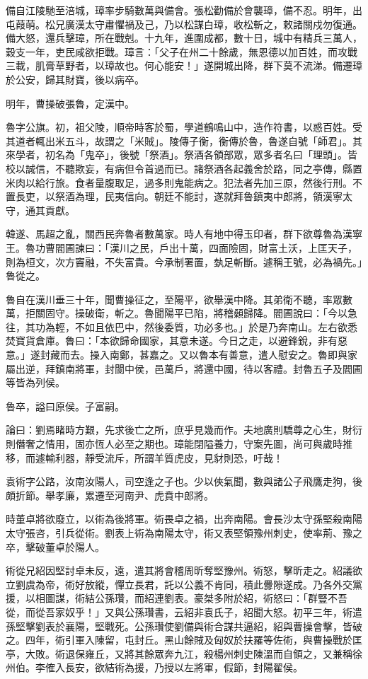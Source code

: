 \begin{pinyinscope}
備自江陵馳至涪城，璋率步騎數萬與備會。張松勸備於會襲璋，備不忍。明年，出屯葭萌。松兄廣漢太守肅懼禍及己，乃以松謀白璋，收松斬之，敕諸關戍勿復通。備大怒，還兵擊璋，所在戰剋。十九年，進圍成都，數十日，城中有精兵三萬人，穀支一年，吏民咸欲拒戰。璋言：「父子在州二十餘歲，無恩德以加百姓，而攻戰三載，肌膏草野者，以璋故也。何心能安！」遂開城出降，群下莫不流涕。備遷璋於公安，歸其財寶，後以病卒。

明年，曹操破張魯，定漢中。

魯字公旗。初，祖父陵，順帝時客於蜀，學道鶴鳴山中，造作符書，以惑百姓。受其道者輒出米五斗，故謂之「米賊」。陵傳子衡，衡傳於魯，魯遂自號「師君」。其來學者，初名為「鬼卒」，後號「祭酒」。祭酒各領部眾，眾多者名曰「理頭」。皆校以誠信，不聽欺妄，有病但令首過而已。諸祭酒各起義舍於路，同之亭傳，縣置米肉以給行旅。食者量腹取足，過多則鬼能病之。犯法者先加三原，然後行刑。不置長吏，以祭酒為理，民夷信向。朝廷不能討，遂就拜魯鎮夷中郎將，領漢寧太守，通其貢獻。

韓遂、馬超之亂，關西民奔魯者數萬家。時人有地中得玉印者，群下欲尊魯為漢寧王。魯功曹閻圃諫曰：「漢川之民，戶出十萬，四面險固，財富土沃，上匡天子，則為桓文，次方竇融，不失富貴。今承制署置，埶足斬斷。遽稱王號，必為禍先。」魯從之。

魯自在漢川垂三十年，聞曹操征之，至陽平，欲舉漢中降。其弟衛不聽，率眾數萬，拒關固守。操破衛，斬之。魯聞陽平已陷，將稽顙歸降。閻圃說曰：「今以急往，其功為輕，不如且依巴中，然後委質，功必多也。」於是乃奔南山。左右欲悉焚寶貨倉庫。魯曰：「本欲歸命國家，其意未遂。今日之走，以避鋒銳，非有惡意。」遂封藏而去。操入南鄭，甚嘉之。又以魯本有善意，遣人慰安之。魯即與家屬出逆，拜鎮南將軍，封閬中侯，邑萬戶，將還中國，待以客禮。封魯五子及閻圃等皆為列侯。

魯卒，謚曰原侯。子富嗣。

論曰：劉焉睹時方艱，先求後亡之所，庶乎見幾而作。夫地廣則驕尊之心生，財衍則僭奢之情用，固亦恆人必至之期也。璋能閉隘養力，守案先圖，尚可與歲時推移，而遽輸利器，靜受流斥，所謂羊質虎皮，見豺則恐，吁哉！

袁術字公路，汝南汝陽人，司空逢之子也。少以俠氣聞，數與諸公子飛鷹走狗，後頗折節。舉孝廉，累遷至河南尹、虎賁中郎將。

時董卓將欲廢立，以術為後將軍。術畏卓之禍，出奔南陽。會長沙太守孫堅殺南陽太守張咨，引兵從術。劉表上術為南陽太守，術又表堅領豫州刺史，使率荊、豫之卒，擊破董卓於陽人。

術從兄紹因堅討卓未反，遠，遣其將會稽周昕奪堅豫州。術怒，擊昕走之。紹議欲立劉虞為帝，術好放縱，憚立長君，託以公義不肯同，積此釁隙遂成。乃各外交黨援，以相圖謀，術結公孫瓚，而紹連劉表。豪桀多附於紹，術怒曰：「群豎不吾從，而從吾家奴乎！」又與公孫瓚書，云紹非袁氏子，紹聞大怒。初平三年，術遣孫堅擊劉表於襄陽，堅戰死。公孫瓚使劉備與術合謀共逼紹，紹與曹操會擊，皆破之。四年，術引軍入陳留，屯封丘。黑山餘賊及匈奴於扶羅等佐術，與曹操戰於匡亭，大敗。術退保雍丘，又將其餘眾奔九江，殺楊州刺史陳溫而自領之，又兼稱徐州伯。李傕入長安，欲結術為援，乃授以左將軍，假節，封陽翟侯。


\end{pinyinscope}
